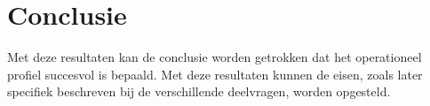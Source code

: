 \section{Conclusie}

Met deze resultaten kan de conclusie worden getrokken dat het operationeel profiel succesvol is bepaald. Met deze resultaten kunnen de eisen, zoals later specifiek beschreven bij de verschillende deelvragen, worden opgesteld.
 

